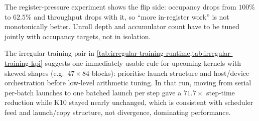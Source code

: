 The register-pressure experiment shows the flip side: occupancy drops from
$100\%$ to $62.5\%$ and throughput drops with it, so ``more in-register
work'' is not monotonically better. Unroll depth and accumulator count have
to be tuned jointly with occupancy targets, not in isolation.

The irregular training pair in \cref{tab:irregular-training-runtime,tab:irregular-training-kpi}
suggests one immediately usable rule for upcoming kernels with skewed shapes
(e.g.\ $47\times84$ blocks): prioritise launch structure and host/device
orchestration before low-level arithmetic tuning. In that run, moving from
serial per-batch launches to one batched launch per step gave a
$71.7\times$ step-time reduction while K10 stayed nearly unchanged, which
is consistent with scheduler feed and launch/copy structure, not divergence,
dominating performance.
